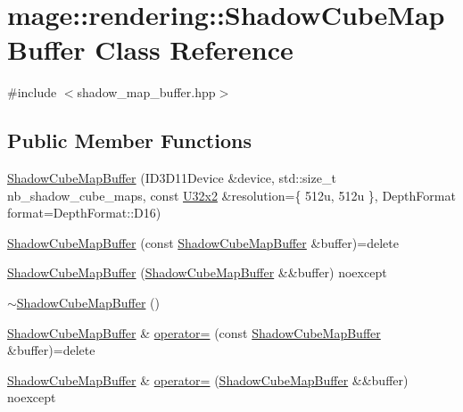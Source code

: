 \hypertarget{classmage_1_1rendering_1_1_shadow_cube_map_buffer}{}\section{mage\+:\+:rendering\+:\+:Shadow\+Cube\+Map\+Buffer Class Reference}
\label{classmage_1_1rendering_1_1_shadow_cube_map_buffer}


{\ttfamily \#include $<$shadow\+\_\+map\+\_\+buffer.\+hpp$>$}

\subsection*{Public Member Functions}
\begin{DoxyCompactItemize}
\item 
\mbox{\hyperlink{classmage_1_1rendering_1_1_shadow_cube_map_buffer_a1b3f357c9235fae50800693fa76eedf0}{Shadow\+Cube\+Map\+Buffer}} (I\+D3\+D11\+Device \&device, std\+::size\+\_\+t nb\+\_\+shadow\+\_\+cube\+\_\+maps, const \mbox{\hyperlink{namespacemage_ae5e7ccf8a1785baaacf57b3a0f4324e2}{U32x2}} \&resolution=\{ 512u, 512u \}, Depth\+Format format=\+Depth\+Format\+::\+D16)
\item 
\mbox{\hyperlink{classmage_1_1rendering_1_1_shadow_cube_map_buffer_a724d0d73588f2e698f2748209befdba8}{Shadow\+Cube\+Map\+Buffer}} (const \mbox{\hyperlink{classmage_1_1rendering_1_1_shadow_cube_map_buffer}{Shadow\+Cube\+Map\+Buffer}} \&buffer)=delete
\item 
\mbox{\hyperlink{classmage_1_1rendering_1_1_shadow_cube_map_buffer_ac636a06f0001b7317ca252b06025ffc4}{Shadow\+Cube\+Map\+Buffer}} (\mbox{\hyperlink{classmage_1_1rendering_1_1_shadow_cube_map_buffer}{Shadow\+Cube\+Map\+Buffer}} \&\&buffer) noexcept
\item 
\mbox{\hyperlink{classmage_1_1rendering_1_1_shadow_cube_map_buffer_a674fdad641a8892821ff8e76d4f05a88}{$\sim$\+Shadow\+Cube\+Map\+Buffer}} ()
\item 
\mbox{\hyperlink{classmage_1_1rendering_1_1_shadow_cube_map_buffer}{Shadow\+Cube\+Map\+Buffer}} \& \mbox{\hyperlink{classmage_1_1rendering_1_1_shadow_cube_map_buffer_a25b59803df1595c97b452dd91c661854}{operator=}} (const \mbox{\hyperlink{classmage_1_1rendering_1_1_shadow_cube_map_buffer}{Shadow\+Cube\+Map\+Buffer}} \&buffer)=delete
\item 
\mbox{\hyperlink{classmage_1_1rendering_1_1_shadow_cube_map_buffer}{Shadow\+Cube\+Map\+Buffer}} \& \mbox{\hyperlink{classmage_1_1rendering_1_1_shadow_cube_map_buffer_a5eb775fdc0f94c220b0115f2695ef18b}{operator=}} (\mbox{\hyperlink{classmage_1_1rendering_1_1_shadow_cube_map_buffer}{Shadow\+Cube\+Map\+Buffer}} \&\&buffer) noexcept

\end{DoxyCompactItemize}
